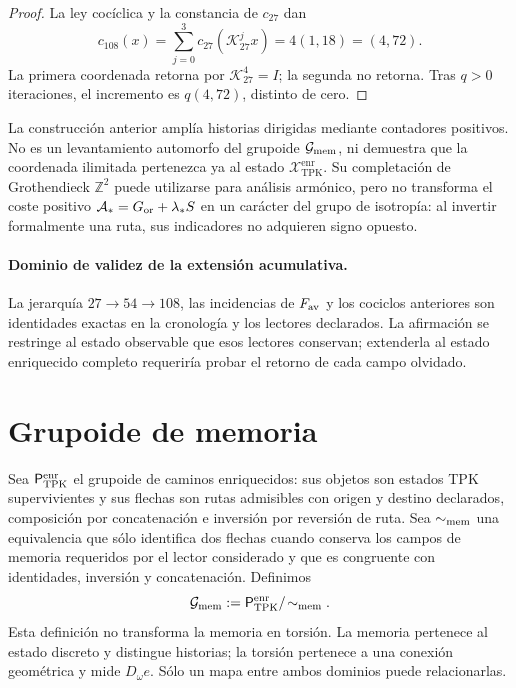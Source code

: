 \begin{proof}
La ley cocíclica y la constancia de \(c_{27}\) dan
\[
 c_{108}(x)
 =\sum_{j=0}^{3}c_{27}(\mathcal K_{27}^{j}x)
 =4(1,18)=(4,72).
\]
La primera coordenada retorna por
\(\mathcal K_{27}^{4}=I\); la segunda no retorna. Tras \(q>0\) iteraciones,
el incremento es \(q(4,72)\), distinto de cero.
\end{proof}

\begin{remark}
La construcción anterior amplía historias dirigidas mediante contadores
positivos. No es un levantamiento automorfo del grupoide
\(\mathcal G_{\rm mem}\), ni demuestra que la coordenada ilimitada pertenezca
ya al estado \(\mathcal X_{\mathrm{TPK}}^{\mathrm{enr}}\). Su completación de Grothendieck
\(\mathbb Z^2\) puede utilizarse para análisis armónico, pero no transforma
el coste positivo
\(\mathcal A_\ast=G_{\rm or}+\lambda_\ast S\) en un carácter del grupo de
isotropía: al invertir formalmente una ruta, sus indicadores no adquieren
signo opuesto.
\end{remark}

\paragraph{Dominio de validez de la extensión acumulativa.}
La jerarquía \(27\to54\to108\), las incidencias de \(F_{\rm av}\) y los
cociclos anteriores son identidades exactas en la cronología y los
lectores declarados. La afirmación se restringe al estado observable que
esos lectores conservan; extenderla al estado enriquecido completo requeriría
probar el retorno de cada campo olvidado.

\section{Grupoide de memoria}
\label{sec:grupoide-memoria-tpk}

Sea \(\mathsf P_{\rm TPK}^{\rm enr}\) el grupoide de caminos enriquecidos:
sus objetos son estados TPK supervivientes y sus flechas son rutas admisibles
con origen y destino declarados, composición por concatenación e inversión
por reversión de ruta. Sea \(\sim_{\rm mem}\) una equivalencia que sólo
identifica dos flechas cuando conserva los campos de memoria requeridos por
el lector considerado y que es congruente con identidades, inversión y
concatenación. Definimos
\[
 \mathcal G_{\rm mem}
 :=\mathsf P_{\rm TPK}^{\rm enr}/\!\sim_{\rm mem}.
\]
Esta definición no transforma la memoria en torsión. La memoria pertenece al
estado discreto y distingue historias; la torsión pertenece a una conexión
geométrica y mide \(D_\omega e\). Sólo un mapa entre ambos dominios puede
relacionarlas.

